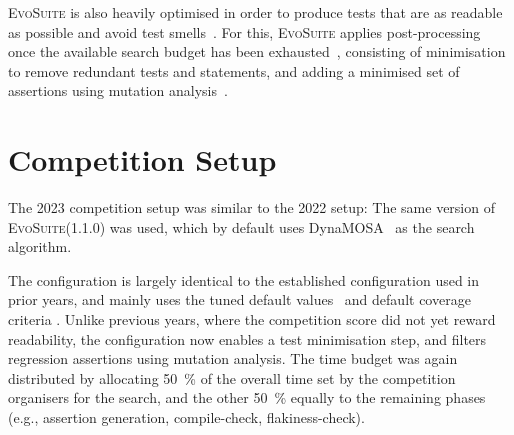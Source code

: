 \documentclass[10pt,conference]{IEEEtran}
\newcommand{\EVOSUITE}{\textsc{EvoSuite}\xspace}
\begin{document}
\EVOSUITE is also heavily optimised in order to produce tests that are as readable as possible and avoid test smells~\cite{panichella2020revisiting}. For this, \EVOSUITE applies post-processing once the available search budget has been exhausted~\cite{FrA11c,FrA13a}, consisting of minimisation to remove redundant tests and statements, and adding a minimised set of assertions using mutation analysis~\cite{10.1109/TSE.2011.93}.





\section{Competition Setup}

The 2023 competition setup was similar to the 2022 setup: The same version of
\EVOSUITE (1.1.0) was used, which by default uses DynaMOSA~\cite{dynamosa} as
the search algorithm.

The configuration is largely identical to the established configuration used in
prior years, and mainly uses the tuned default
values~\cite{arcuri2013parameter} and default coverage criteria
\cite{rojas2015combining}.
%
Unlike previous years, where the competition score did not yet reward readability,
the configuration now enables a test minimisation step, and filters regression
assertions using mutation analysis.
%
The time budget was again distributed by allocating \SI{50}{\percent} of the overall time
set by the competition organisers for the search, and the other \SI{50}{\percent} equally to
the remaining phases (e.g., assertion generation, compile-check, flakiness-check).
\end{document}
